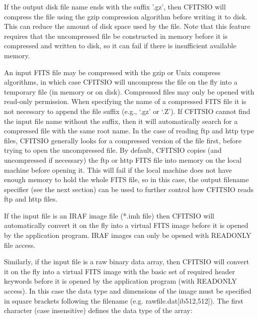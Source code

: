 \documentclass[11pt]{book}
\begin{document}
If the output disk file name ends with the suffix '.gz', then CFITSIO
will compress the file using the gzip compression algorithm before
writing it to disk.  This can reduce the amount of disk space used by
the file.  Note that this feature requires that the uncompressed file
be constructed in memory before it is compressed and written to disk,
so it can fail if there is insufficient available memory.

An input FITS file may be compressed with the gzip or Unix compress
algorithms, in which case CFITSIO will uncompress the file on the fly
into a temporary file (in memory or on disk).  Compressed files may
only be opened with read-only permission.  When specifying the name of
a compressed FITS file it is not necessary to append the file suffix
(e.g., `.gz' or `.Z').  If CFITSIO cannot find the input file name
without the suffix, then it will automatically search for a compressed
file with the same root name.  In the case of reading ftp and http type
files, CFITSIO generally looks for a compressed version of the file
first, before trying to open the uncompressed file.  By default,
CFITSIO copies (and uncompressed if necessary) the ftp or http FITS
file into memory on the local machine before opening it.  This will
fail if the local machine does not have enough memory to hold the whole
FITS file, so in this case, the output filename specifier (see the next
section) can be used to further control how CFITSIO reads ftp and http
files.

If the input file is an IRAF image file (*.imh file) then CFITSIO will
automatically convert it on the fly into a virtual FITS image before it
is opened by the application program.  IRAF images can only be opened
with READONLY file access.

Similarly, if the input file is a raw binary data array, then CFITSIO
will convert it on the fly into a virtual FITS image with the basic set
of required header keywords before it is opened by the application
program (with READONLY access).  In this case the data type and
dimensions of the image must be specified in square brackets following
the filename (e.g. rawfile.dat[ib512,512]). The first character (case
insensitive) defines the data type of the array:
\end{document}
